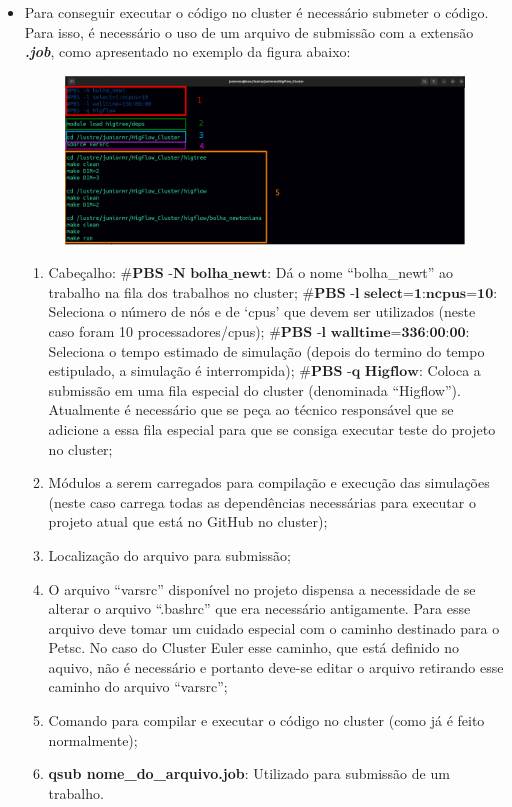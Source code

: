 \documentclass[12pt]{article}
\begin{document}
\begin{itemize}
	\item Para conseguir executar o código no cluster é necessário submeter o código. Para isso, é necessário o uso de um arquivo de submissão com a extensão \textbf{\textit{.job}}, como apresentado no exemplo da figura abaixo:
	\begin{figure}[htb]
		\centering
		\includegraphics[trim = 0mm 0mm 210mm 0mm,clip,width=1.05\linewidth]{figures/job_box.png}
		\label{fig:job}
	\end{figure}
	\begin{enumerate}
		\item Cabeçalho: 
			\subitem $\textbf{\#PBS\ -N\ bolha\_newt}$: Dá o nome ``bolha\_newt'' ao trabalho na fila dos trabalhos no cluster;
			\subitem $\textbf{\#PBS\ -l\ select=1:ncpus=10}$: Seleciona o número de nós e de `cpus' que devem ser utilizados (neste caso foram 10 processadores/cpus);
			\subitem $\textbf{\#PBS\ -l\ walltime=336:00:00}$: Seleciona o tempo estimado de simulação (depois do termino do tempo estipulado, a simulação é interrompida);
			\subitem $\textbf{\#PBS\ -q\ Higflow}$: Coloca a submissão em uma fila especial do cluster (denominada ``Higflow''). Atualmente é necessário que se peça ao técnico responsável que se adicione a essa fila especial para que se consiga executar teste do projeto no cluster;
		\item Módulos a serem carregados para compilação e execução das simulações (neste caso carrega todas as dependências necessárias para executar o projeto atual que está no GitHub no cluster);
		\item Localização do arquivo para submissão;
		\item O arquivo ``varsrc'' disponível no projeto dispensa a necessidade de se alterar o arquivo ``.bashrc'' que era necessário antigamente. Para esse arquivo deve tomar um cuidado especial com o caminho destinado para o Petsc. No caso do Cluster Euler esse caminho, que está definido no aquivo, não é necessário e portanto deve-se editar o arquivo retirando esse caminho do arquivo ``varsrc'';
		\item Comando para compilar e executar o código no cluster (como já é feito normalmente);
		\item \textbf{qsub nome\_do\_arquivo.job}: Utilizado para submissão de um trabalho.
	\end{enumerate}
\end{itemize}
\end{document}
